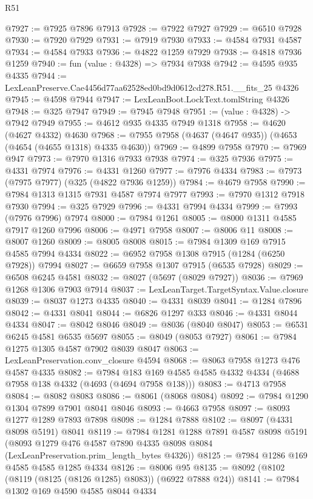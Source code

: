 \begin{lexlean}{R51}
\begin{coremodule}
@7927 := @7925 @7896 @7913
@7928 := @7922 @7927
@7929 := @6510 @7928
@7930 := @7920 @7929
@7931 := @7919 @7930
@7933 := @4584 @7931 @4587
@7934 := @4584 @7933
@7936 := @4822 @1259 @7929
@7938 := @4818 @7936 @1259
@7940 := fun (value : @4328) => @7934 @7938
@7942 := @4595 @935 @4335
@7944 := LexLeanPreserve.Cae4456d77aa62528ed0bd9d0612cd278.R51.__fits_25 @4326
@7945 := @4598 @7944
@7947 := LexLeanBoot.LockText.tomlString @4326
@7948 := @325 @7947
@7949 := @7945 @7948
@7951 := (value : @4328) -> @7942 @7949
@7955 := @4612 @935 @4335 @7949 @1318
@7958 := @4620 (@4627 @4332) @4630
@7968 := @7955 @7958 (@4637 (@4647 @935)) (@4653 (@4654 (@4655 @1318) @4335 @4630))
@7969 := @4899 @7958
@7970 := @7969 @947
@7973 := @7970 @1316 @7933 @7938
@7974 := @325 @7936
@7975 := @4331 @7974
@7976 := @4331 @1260
@7977 := @7976 @4334
@7983 := @7973 (@7975 @7977) (@325 (@4822 @7936 @1259))
@7984 := @4679 @7958
@7990 := @7984 @1313 @1315 @7931 @4587 @7974 @7977
@7993 := @7970 @1312 @7918 @7930
@7994 := @325 @7929
@7996 := @4331 @7994 @4334
@7999 := @7993 (@7976 @7996) @7974
@8000 := @7984 @1261
@8005 := @8000 @1311 @4585 @7917 @1260 @7996
@8006 := @4971 @7958
@8007 := @8006 @11
@8008 := @8007 @1260
@8009 := @8005 @8008
@8015 := @7984 @1309 @169 @7915 @4585 @7994 @4334
@8022 := @6952 @7958 @1308 @7915 (@1284 (@6250 @7928)) @7994
@8027 := @6659 @7958 @1307 @7915 (@6535 @7928)
@8029 := @6508 @6245 @4581
@8032 := @8027 (@5697 (@8029 @7927))
@8036 := @7969 @1268 @1306 @7903 @7914
@8037 := LexLeanTarget.TargetSyntax.Value.closure
@8039 := @8037 @1273 @4335
@8040 := @4331 @8039
@8041 := @1284 @7896
@8042 := @4331 @8041
@8044 := @6826 @1297 @333
@8046 := @4331 @8044 @4334
@8047 := @8042 @8046
@8049 := @8036 (@8040 @8047)
@8053 := @6531 @6245 @4581 @6535 @5697
@8055 := @8049 (@8053 @7927)
@8061 := @7984 @1275 @1305 @4587 @7902 @8039 @8047
@8063 := LexLeanPreservation.conv_closure @4594
@8068 := @8063 @7958 @1273 @476 @4587 @4335
@8082 := @7984 @183 @169 @4585 @4585 @4332 @4334 (@4688 @7958 @138 @4332 (@4693 (@4694 @7958 @138)))
@8083 := @4713 @7958
@8084 := @8082 @8083
@8086 := @8061 (@8068 @8084)
@8092 := @7984 @1290 @1304 @7899 @7901 @8041 @8046
@8093 := @4663 @7958
@8097 := @8093 @1277 @1289 @7893 @7898
@8098 := @1284 @7888
@8102 := @8097 (@4331 @8098 @5191) @8041
@8119 := @7984
    @1281
    @1288
    @7891
    @4587
    @8098
    @5191
    (@8093 @1279 @476 @4587 @7890 @4335 @8098 @8084 (LexLeanPreservation.prim_length_bytes @4326))
@8125 := @7984 @1286 @169 @4585 @4585 @1285 @4334
@8126 := @8006 @95
@8135 := @8092 (@8102 (@8119 (@8125 (@8126 @1285) @8083)) (@6922 @7888 @24))
@8141 := @7984 @1302 @169 @4590 @4585 @8044 @4334

\end{coremodule}
\end{lexlean}
